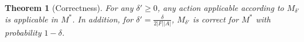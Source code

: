 \documentclass[letterpaper]{article} %
\newtheorem{theorem}{Theorem}
\begin{document}
\begin{theorem}[Correctness]\label{thm:sam-safe}
For any $\delta'\geq 0$, any action applicable 
according to $M_{\delta'}$ is applicable in $M^*$. 
In addition, for $\delta'=\frac{\delta}{2|F||A|}$, $M_{\delta'}$ is correct for $M^*$ with probability $1-\delta$. 
\end{theorem}
\end{document}

